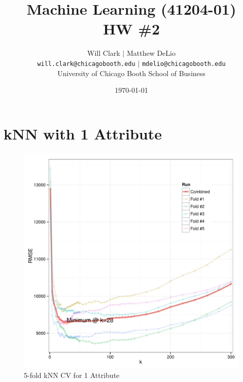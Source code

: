 \documentclass[11pt, fleqn]{article}
\begin{document}
\title{Machine Learning (41204-01)\\HW \#2}
\author{Will Clark $\vert$ Matthew DeLio \\
\texttt{will.clark@chicagobooth.edu} $\vert$ \texttt{mdelio@chicagobooth.edu} \\
University of Chicago Booth School of Business}
\date{\today}
\maketitle

\section{kNN with 1 Attribute}

\begin{figure}[!htb]
  \centering
  \includegraphics[scale=.5]{1p_cv_k.pdf}
  \caption{5-fold kNN CV for 1 Attribute}
  \label{fig:1p_k}
\end{figure}
\end{document}
